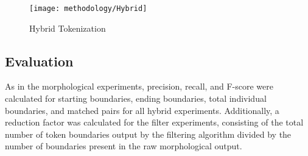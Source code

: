 \begin{figure}[h!]
	\texttt{[image: methodology/Hybrid]}
	\caption{Hybrid Tokenization}
	\label{hybriddiagram}
\end{figure}

\subsection{Evaluation}
As in the morphological experiments, precision, recall, and F-score were calculated for starting boundaries, ending boundaries, total individual boundaries, and matched pairs for all hybrid experiments. Additionally, a reduction factor was calculated for the filter experiments, consisting of the total number of token boundaries output by the filtering algorithm divided by the number of boundaries present in the raw morphological output.